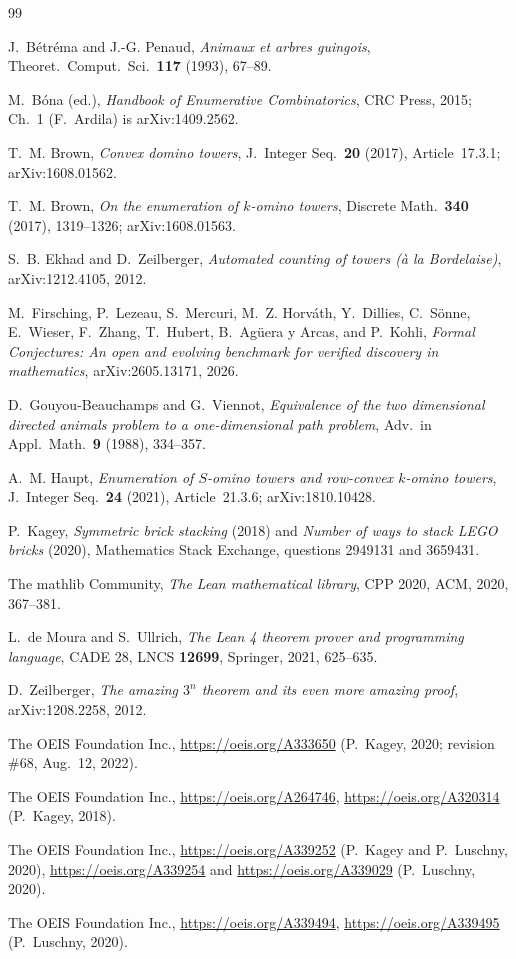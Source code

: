 \documentclass[11pt]{amsart}
\theoremstyle{plain}
\theoremstyle{definition}
\begin{document}
{\footnotesize
\begin{thebibliography}{99}\setlength{\itemsep}{0pt}

J.~Bétréma and J.-G. Penaud, \emph{Animaux et arbres guingois}, Theoret.\ Comput.\ Sci.\ \textbf{117} (1993), 67--89.

M.~Bóna (ed.), \emph{Handbook of Enumerative Combinatorics}, CRC Press, 2015; Ch.~1 (F.~Ardila) is arXiv:1409.2562.

T.~M. Brown, \emph{Convex domino towers}, J.\ Integer Seq.\ \textbf{20} (2017), Article~17.3.1; arXiv:1608.01562.

T.~M. Brown, \emph{On the enumeration of $k$-omino towers}, Discrete Math.\ \textbf{340} (2017), 1319--1326; arXiv:1608.01563.

S.~B. Ekhad and D.~Zeilberger, \emph{Automated counting of towers (à la Bordelaise)}, arXiv:1212.4105, 2012.

M.~Firsching, P.~Lezeau, S.~Mercuri, M.~Z. Horv\'ath, Y.~Dillies, C.~S\"onne, E.~Wieser, F.~Zhang, T.~Hubert, B.~Ag\"uera y Arcas, and P.~Kohli, \emph{Formal Conjectures: An open and evolving benchmark for verified discovery in mathematics}, arXiv:2605.13171, 2026.

D.~Gouyou-Beauchamps and G.~Viennot, \emph{Equivalence of the two dimensional directed animals problem to a one-dimensional path problem}, Adv.\ in Appl.\ Math.\ \textbf{9} (1988), 334--357.

A.~M. Haupt, \emph{Enumeration of $S$-omino towers and row-convex $k$-omino towers}, J.\ Integer Seq.\ \textbf{24} (2021), Article~21.3.6; arXiv:1810.10428.

P.~Kagey, \emph{Symmetric brick stacking} (2018) and \emph{Number of ways to stack LEGO bricks} (2020), Mathematics Stack Exchange, questions 2949131 and 3659431.

The mathlib Community, \emph{The Lean mathematical library}, CPP 2020, ACM, 2020, 367--381.

L.~de Moura and S.~Ullrich, \emph{The Lean 4 theorem prover and programming language}, CADE 28, LNCS \textbf{12699}, Springer, 2021, 625--635.

D.~Zeilberger, \emph{The amazing $3^n$ theorem and its even more amazing proof}, arXiv:1208.2258, 2012.

The OEIS Foundation Inc., \url{https://oeis.org/A333650} (P.~Kagey, 2020; revision \#68, Aug.~12, 2022).

The OEIS Foundation Inc., \url{https://oeis.org/A264746}, \url{https://oeis.org/A320314} (P.~Kagey, 2018).

The OEIS Foundation Inc., \url{https://oeis.org/A339252} (P.~Kagey and P.~Luschny, 2020), \url{https://oeis.org/A339254} and \url{https://oeis.org/A339029} (P.~Luschny, 2020).

The OEIS Foundation Inc., \url{https://oeis.org/A339494}, \url{https://oeis.org/A339495} (P.~Luschny, 2020).

\end{thebibliography}
}
\end{document}
